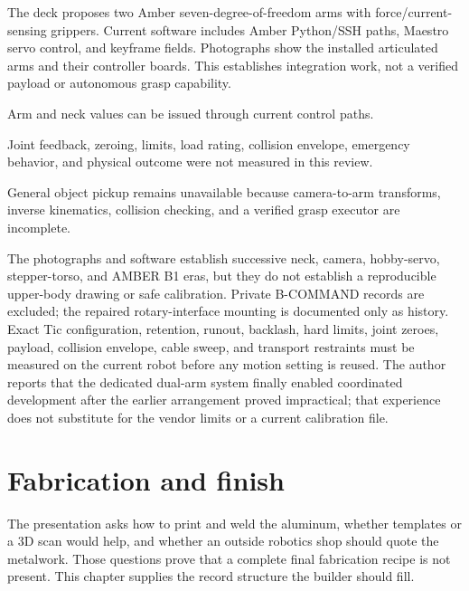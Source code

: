 \documentclass[10pt,openany]{book}
\begin{document}
The deck proposes two Amber seven-degree-of-freedom arms with force/current-sensing grippers. Current software includes Amber Python/SSH paths, Maestro servo control, and keyframe fields. Photographs show the installed articulated arms and their controller boards. This establishes integration work, not a verified payload or autonomous grasp capability.


\Commanded\quad Arm and neck values can be issued through current control paths.\par
\Unverified\quad Joint feedback, zeroing, limits, load rating, collision envelope, emergency behavior, and physical outcome were not measured in this review.\par
\Planned\quad General object pickup remains unavailable because camera-to-arm transforms, inverse kinematics, collision checking, and a verified grasp executor are incomplete.

\begin{fieldnotebox}[title={RECORD LIMIT: UPPER BODY AND ARMS}]
The photographs and software establish successive neck, camera, hobby-servo, stepper-torso, and AMBER B1 eras, but they do not establish a reproducible upper-body drawing or safe calibration. Private B-COMMAND records are excluded; the repaired rotary-interface mounting is documented only as history. Exact Tic configuration, retention, runout, backlash, hard limits, joint zeroes, payload, collision envelope, cable sweep, and transport restraints must be measured on the current robot before any motion setting is reused. The author reports that the dedicated dual-arm system finally enabled coordinated development after the earlier arrangement proved impractical; that experience does not substitute for the vendor limits or a current calibration file.
\end{fieldnotebox}


\chapter{Fabrication and finish}

The presentation asks how to print and weld the aluminum, whether templates or a 3D scan would help, and whether an outside robotics shop should quote the metalwork. Those questions prove that a complete final fabrication recipe is not present. This chapter supplies the record structure the builder should fill.
\end{document}
